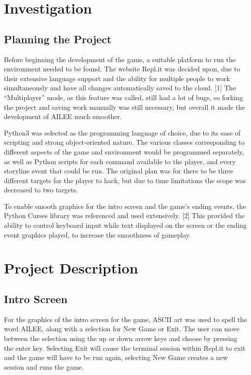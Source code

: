 \documentclass[conference]{IEEEtran}
\begin{document}
\section{Investigation}

\subsection{Planning the Project}

Before beginning the development of the game, a suitable platform to run the environment needed to be found. The website Repl.it was decided upon, due to their extensive language support and the ability for multiple people to work simultaneously and have all changes automatically saved to the cloud. [1] The “Multiplayer” mode, as this feature was called, still had a lot of bugs, so forking the project and saving work manually was still necessary, but overall it made the development of AILEE much smoother. 

Python3 was selected as the programming language of choice, due to its ease of scripting and strong object-oriented nature. The various classes corresponding to different aspects of the game and environment would be programmed separately, as well as Python scripts for each command available to the player, and every storyline event that could be run. The original plan was for there to be three different targets for the player to hack, but due to time limitations the scope was decreased to two targets.

To enable smooth graphics for the intro screen and the game’s ending events, the Python Curses library was referenced and used extensively. [2] This provided the ability to control keyboard input while text displayed on the screen or the ending event graphics played, to increase the smoothness of gameplay. 

\section{Project Description}

\subsection{Intro Screen}\label{AA}
For the graphics of the intro screen for the game, ASCII art was used to spell the word AILEE, along with a selection for New Game or Exit. The user can move between the selection using the up or down arrow keys and choose by pressing the enter key. Selecting Exit will cause the terminal session within Repl.it to exit and the game will have to be run again, selecting New Game creates a new session and runs the game. 
\end{document}

